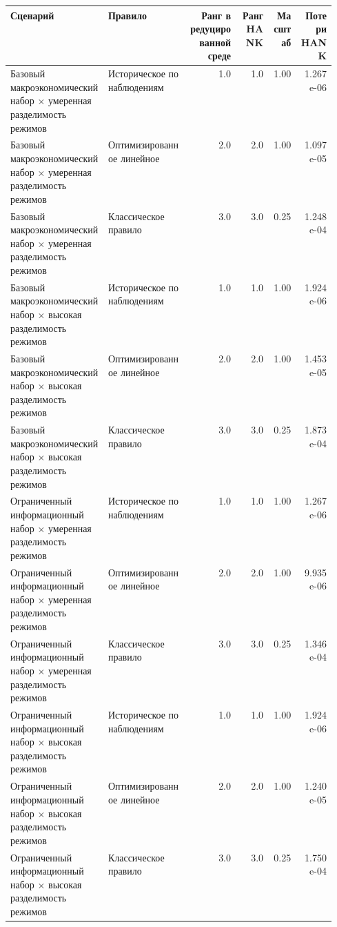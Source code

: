\begin{tabular}{p{0.30\linewidth}p{0.25\linewidth}rrrr}
\toprule
Сценарий & Правило & Ранг в редуцированной среде & Ранг HANK & Масштаб & Потери HANK \\
\midrule
Базовый макроэкономический набор × умеренная разделимость режимов & Историческое по наблюдениям & 1.0 & 1.0 & 1.00 & 1.267e-06 \\
Базовый макроэкономический набор × умеренная разделимость режимов & Оптимизированное линейное & 2.0 & 2.0 & 1.00 & 1.097e-05 \\
Базовый макроэкономический набор × умеренная разделимость режимов & Классическое правило & 3.0 & 3.0 & 0.25 & 1.248e-04 \\
Базовый макроэкономический набор × высокая разделимость режимов & Историческое по наблюдениям & 1.0 & 1.0 & 1.00 & 1.924e-06 \\
Базовый макроэкономический набор × высокая разделимость режимов & Оптимизированное линейное & 2.0 & 2.0 & 1.00 & 1.453e-05 \\
Базовый макроэкономический набор × высокая разделимость режимов & Классическое правило & 3.0 & 3.0 & 0.25 & 1.873e-04 \\
Ограниченный информационный набор × умеренная разделимость режимов & Историческое по наблюдениям & 1.0 & 1.0 & 1.00 & 1.267e-06 \\
Ограниченный информационный набор × умеренная разделимость режимов & Оптимизированное линейное & 2.0 & 2.0 & 1.00 & 9.935e-06 \\
Ограниченный информационный набор × умеренная разделимость режимов & Классическое правило & 3.0 & 3.0 & 0.25 & 1.346e-04 \\
Ограниченный информационный набор × высокая разделимость режимов & Историческое по наблюдениям & 1.0 & 1.0 & 1.00 & 1.924e-06 \\
Ограниченный информационный набор × высокая разделимость режимов & Оптимизированное линейное & 2.0 & 2.0 & 1.00 & 1.240e-05 \\
Ограниченный информационный набор × высокая разделимость режимов & Классическое правило & 3.0 & 3.0 & 0.25 & 1.750e-04 \\
\bottomrule
\end{tabular}